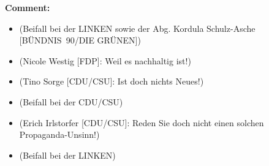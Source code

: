 \documentclass{article}
\begin{document}
\noindent\textbf{Comment:}
\begin{itemize}
    \setlength\itemsep{-3pt}
    \item (Beifall bei der LINKEN sowie der Abg. Kordula Schulz-Asche [BÜNDNIS 90/DIE GRÜNEN])
    \setlength\itemsep{-3pt}
    \item (Nicole Westig [FDP]: Weil es nachhaltig ist!)
    \setlength\itemsep{-3pt}
    \item (Tino Sorge [CDU/CSU]: Ist doch nichts Neues!)
    \setlength\itemsep{-3pt}
    \item (Beifall bei der CDU/CSU)
    \setlength\itemsep{-3pt}
    \item (Erich Irlstorfer [CDU/CSU]: Reden Sie doch nicht einen solchen Propaganda-Unsinn!)
    \setlength\itemsep{-3pt}
    \item (Beifall bei der LINKEN)
\end{itemize}
\end{document}
